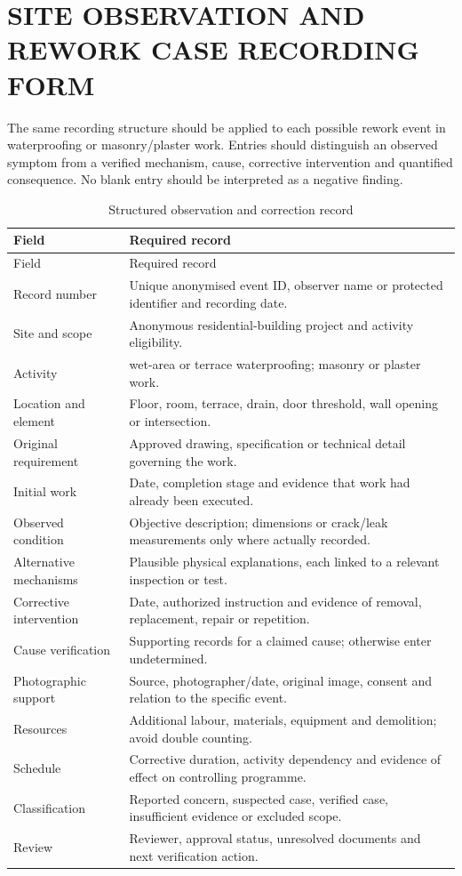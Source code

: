 \chapter{SITE OBSERVATION AND REWORK CASE RECORDING FORM}
\label{app:observation}
The same recording structure should be applied to each possible rework event in waterproofing or masonry/plaster work. Entries should distinguish an observed symptom from a verified mechanism, cause, corrective intervention and quantified consequence. No blank entry should be interpreted as a negative finding.
\begin{longtable}{@{}L{0.32\textwidth}L{0.57\textwidth}@{}}
\caption{Structured observation and correction record}\label{tab:observationform}\\
\toprule Field & Required record\\ \midrule\endfirsthead
\toprule Field & Required record\\ \midrule\endhead
Record number & Unique anonymised event ID, observer name or protected identifier and recording date.\\
Site and scope & Anonymous residential-building project and activity eligibility.\\
Activity & wet-area or terrace waterproofing; masonry or plaster work.\\
Location and element & Floor, room, terrace, drain, door threshold, wall opening or intersection.\\
Original requirement & Approved drawing, specification or technical detail governing the work.\\
Initial work & Date, completion stage and evidence that work had already been executed.\\
Observed condition & Objective description; dimensions or crack/leak measurements only where actually recorded.\\
Alternative mechanisms & Plausible physical explanations, each linked to a relevant inspection or test.\\
Corrective intervention & Date, authorized instruction and evidence of removal, replacement, repair or repetition.\\
Cause verification & Supporting records for a claimed cause; otherwise enter undetermined.\\
Photographic support & Source, photographer/date, original image, consent and relation to the specific event.\\
Resources & Additional labour, materials, equipment and demolition; avoid double counting.\\
Schedule & Corrective duration, activity dependency and evidence of effect on controlling programme.\\
Classification & Reported concern, suspected case, verified case, insufficient evidence or excluded scope.\\
Review & Reviewer, approval status, unresolved documents and next verification action.\\
\bottomrule
\end{longtable}
